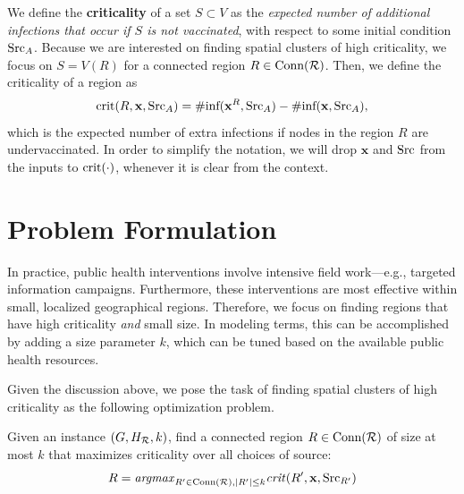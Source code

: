\setlength{\abovedisplayskip}{3pt}
\setlength{\belowdisplayskip}{3pt}


We define the \textbf{criticality} of a set $S\subset V$ as
the \emph{expected number of additional infections that occur if $S$ is not vaccinated},
with respect to some initial condition $\text{Src}_A$.
Because we are interested on finding spatial clusters of high criticality, 
we focus on $S=V(R)$ for a connected region $R\in\text{Conn}(\mathcal{R})$.
Then, we define the criticality of a region as
\[
\text{crit}(R, \mathbf{x}, \text{Src}_A) = \#\text{inf}(\mathbf{x}^R, \text{Src}_A) - \#\text{inf}(\mathbf{x}, \text{Src}_A),
\]
which is the expected number of extra infections if nodes in the region $R$ are undervaccinated. In order to simplify the notation, we will drop $\mathbf{x}$ and $\text{Src}$ from the inputs to $\text{crit}(\cdot)$, whenever it is clear from the context.



\section{Problem Formulation}
\label{sec:problem-statement}

\noindent 
{} In practice, public health interventions involve intensive field work---e.g., targeted information campaigns. Furthermore, these interventions are most effective within small, localized geographical regions. Therefore, we focus on finding regions that have high criticality \emph{and} small size. In modeling terms, this can be accomplished by adding a size parameter $k$, which can be tuned based on the available public health resources. 

Given the discussion above, we pose the task of finding spatial clusters of high criticality as the following optimization problem.
\begin{problem}[$\maxcrit{}(G, H_{\R}, k)$]
\label{prob:maxcrit}
Given an instance $(G, H_{\mathcal{R}}, k)$, find a connected region $R\in\text{Conn}(\mathcal{R})$ of size at most $k$ that maximizes criticality over all choices of source:
\[
R= \mbox{\emph{argmax}}_{R'\in\text{Conn}(\mathcal{R}), |R'|\leq k} \text{\emph{crit}}(R', \mathbf{x}, \text{Src}_{R'})
\]
\end{problem}

